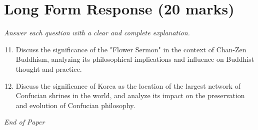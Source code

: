 \documentclass[12pt]{article}
\begin{document}
\section*{Long Form Response (20 marks)}
\textit{Answer each question with a clear and complete explanation.}
\begin{enumerate}[label=\arabic*.]
\setcounter{enumi}{10}
\item Discuss the significance of the "Flower Sermon" in the context of Chan-Zen Buddhism, analyzing its philosophical implications and influence on Buddhist thought and practice.
\item Discuss the significance of Korea as the location of the largest network of Confucian shrines in the world, and analyze its impact on the preservation and evolution of Confucian philosophy.
\end{enumerate}

\vfill
\noindent\textit{End of Paper}
\end{document}
